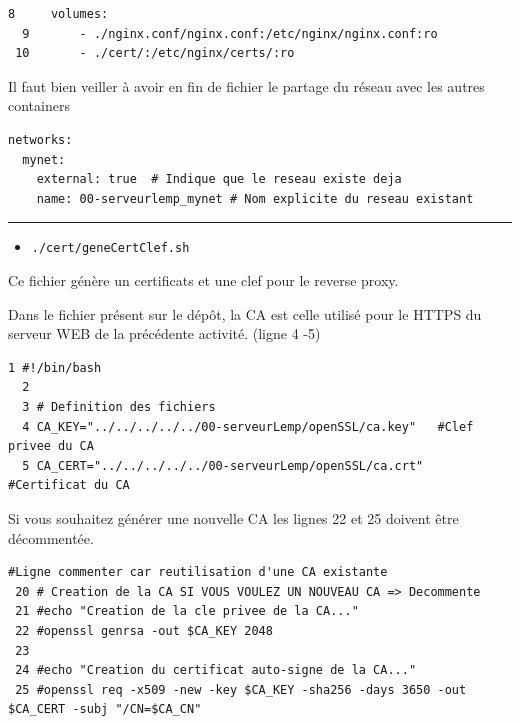 \documentclass[french, 12pt]{article}%
\newcommand{\itemE}{\item[$\bullet$]}
\begin{document}
\begin{lstlisting}[style = commande]
  8     volumes:
  9       - ./nginx.conf/nginx.conf:/etc/nginx/nginx.conf:ro
 10       - ./cert/:/etc/nginx/certs/:ro
\end{lstlisting}


Il faut bien veiller à avoir en fin de fichier le partage du réseau avec les autres containers 

\begin{lstlisting}[style = commande]
networks:
  mynet:
    external: true  # Indique que le reseau existe deja
    name: 00-serveurlemp_mynet # Nom explicite du reseau existant
\end{lstlisting}



\begin{center}
 \rule{0.75\linewidth}{1pt}
 \end{center}


\begin{itemize}
\itemE \verb?./cert/geneCertClef.sh?
\end{itemize}
Ce fichier génère un certificats et une clef pour le reverse proxy.

Dans le fichier présent sur le dépôt, la CA est celle utilisé pour le HTTPS du serveur WEB de la précédente activité.	(ligne 4 -5)

\begin{lstlisting}[style = commande]
  1 #!/bin/bash                                                                                                                                                                               
  2 
  3 # Definition des fichiers
  4 CA_KEY="../../../../../00-serveurLemp/openSSL/ca.key"   #Clef privee du CA
  5 CA_CERT="../../../../../00-serveurLemp/openSSL/ca.crt"  #Certificat du CA

\end{lstlisting}

Si vous souhaitez générer une nouvelle CA les lignes 22 et 25 doivent être décommentée.

\begin{lstlisting}[style = commande]
#Ligne commenter car reutilisation d'une CA existante
 20 # Creation de la CA SI VOUS VOULEZ UN NOUVEAU CA => Decommente
 21 #echo "Creation de la cle privee de la CA..."
 22 #openssl genrsa -out $CA_KEY 2048
 23 
 24 #echo "Creation du certificat auto-signe de la CA..."
 25 #openssl req -x509 -new -key $CA_KEY -sha256 -days 3650 -out $CA_CERT -subj "/CN=$CA_CN"
\end{lstlisting}
\end{document}
